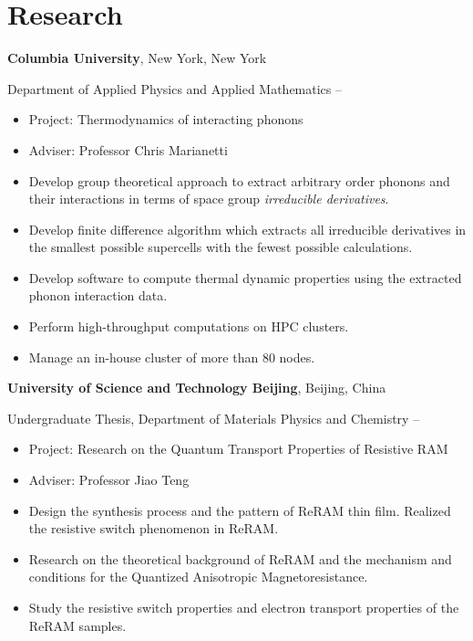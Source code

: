 \documentclass[
  a4paper,
  12pt
]{cv}
\begin{document}
\section{Research}

{\textbf{Columbia University}},
New York, New York

Department of Applied Physics and Applied Mathematics
\hfill
{} --
\begin{itemize}
\item Project: Thermodynamics of interacting phonons
\item Adviser: Professor Chris Marianetti
\item Develop group theoretical approach to extract arbitrary order phonons and their interactions in terms of space group \emph{irreducible derivatives}.
\item Develop finite difference algorithm which extracts all irreducible derivatives in the smallest possible supercells with the fewest possible calculations.
\item Develop software to compute thermal dynamic properties using the extracted phonon interaction data.
\item Perform high-throughput computations on HPC clusters.
\item Manage an in-house cluster of more than 80 nodes.
\end{itemize}

{\textbf{University of Science and Technology Beijing}},
Beijing, China

Undergraduate Thesis,
Department of Materials Physics and Chemistry
\hfill
{} --
\begin{itemize}
\item Project: Research on the Quantum Transport Properties of Resistive RAM
\item Adviser: Professor Jiao Teng
\item Design the synthesis process and the pattern of ReRAM thin film. Realized the resistive switch phenomenon in ReRAM.
\item Research on the theoretical background of ReRAM and the mechanism and conditions for the Quantized Anisotropic Magnetoresistance.
\item Study the resistive switch properties and electron transport properties of the ReRAM samples.
\end{itemize}
\end{document}
